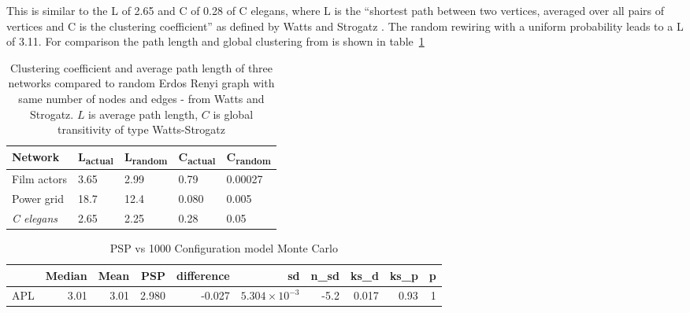 This is similar to the L of 2.65 and C of 0.28 of C elegans, where L is the ``shortest path between two vertices, averaged over all pairs of vertices and C is the clustering coefficient'' as defined by Watts and Strogatz \cite{watts1998collective}. The random rewiring with a uniform probability leads to a L of 3.11. For comparison the path length and global clustering from \cite{watts1998collective} is shown in table~\ref{tab:clustering and path length Watts and Strogatz}


\begin{table}[h]
    \centering
    \begin{tabular}{lllll}
    \toprule
    Network      & L\textsubscript{actual} & L\textsubscript{random} & C\textsubscript{actual} & C\textsubscript{random} \\
    \midrule
     Film actors    & 3.65 & 2.99 & 0.79 & 0.00027\\
     Power grid & 18.7 & 12.4 & 0.080 & 0.005 \\
     \textit{C elegans} & 2.65 & 2.25 & 0.28 & 0.05 \\
     \bottomrule
    \end{tabular}
    \caption{Clustering coefficient and average path length of three networks compared to random Erdos Renyi graph with same number of nodes and edges - from Watts and Strogatz\cite{watts1998collective}. $L$ is average path length, $C$ is global transitivity of type Watts-Strogatz}
    \label{tab:clustering and path length Watts and Strogatz}
\end{table}


\begin{table}[ht]
\centering
\begin{adjustbox}{width=\textwidth}

\begin{tabular}{rrrrrrrrrr}
  \toprule
 & Median & Mean & PSP & difference & sd & n\_sd & ks\_d & ks\_p & p \\ 
  \midrule
APL & 3.01 & 3.01 & 2.980 & -0.027 & $5.304 \times 10^{-3}$ & -5.2 & 0.017 & 0.93 & 1 \\ 

   \bottomrule
\end{tabular}
\end{adjustbox}
\caption{PSP vs 1000 Configuration model Monte Carlo} 
\end{table}


